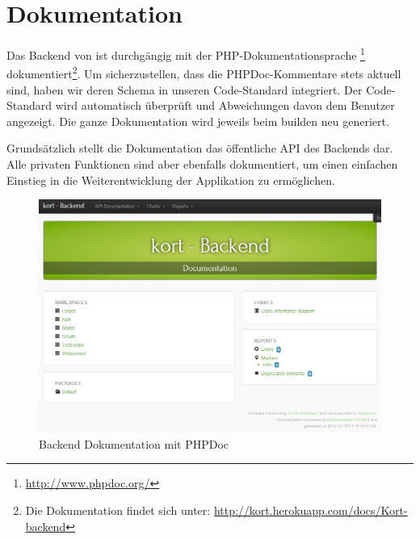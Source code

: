 \section{Dokumentation}
\label{backend-dokumentation}

Das Backend von \kort{} ist durchgängig mit der PHP-Dokumentationsprache \footnote{\url{http://www.phpdoc.org/}} dokumentiert\footnote{Die Dokumentation findet sich unter: \url{http://kort.herokuapp.com/docs/Kort-backend}}.
Um sicherzustellen, dass die PHPDoc-Kommentare stets aktuell sind, haben wir deren Schema in unseren Code-Standard integriert.
Der Code-Standard wird automatisch überprüft und Abweichungen davon dem Benutzer angezeigt.
Die ganze Dokumentation wird jeweils beim builden neu generiert.

Grundsätzlich stellt die Dokumentation das öffentliche \gls{API} des Backends dar.
Alle privaten Funktionen sind aber ebenfalls dokumentiert, um einen einfachen Einstieg in die Weiterentwicklung der Applikation zu ermöglichen.

\begin{figure}[H]
	\centering
	\includegraphics[width=\textwidth]{images/implementation/backend/kort-backend-documentation}
	\caption{\kort{} Backend Dokumentation mit PHPDoc}
	\label{image-kort-backend-documentation}
\end{figure}